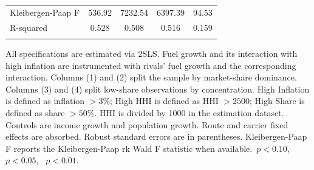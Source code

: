 \begin{table}[p]
\begin{tabular}{l*{4}{c}}
Kleibergen-Paap F   &      536.92         &     7232.54         &     6397.39         &       94.53         \\
R-squared           &       0.528         &       0.508         &       0.516         &       0.159         \\
\hline \\[-1.8ex]
\end{tabular}
\begin{tablenotes}[Note]
All specifications are estimated via 2SLS. Fuel growth and its interaction with high inflation are instrumented with rivals' fuel growth and the corresponding interaction. Columns (1) and (2) split the sample by market-share dominance. Columns (3) and (4) split low-share observations by concentration. High Inflation is defined as inflation $>3\%$; High HHI is defined as HHI $>2500$; High Share is defined as share $>50\%$. HHI is divided by 1000 in the estimation dataset. Controls are income growth and population growth. Route and carrier fixed effects are absorbed. Robust standard errors are in parentheses. Kleibergen-Paap F reports the Kleibergen-Paap rk Wald F statistic when available.\sym{*}~$p<0.10$, \sym{**}~$p<0.05$, \sym{***}~$p<0.01$.
\end{tablenotes}
\end{table}
